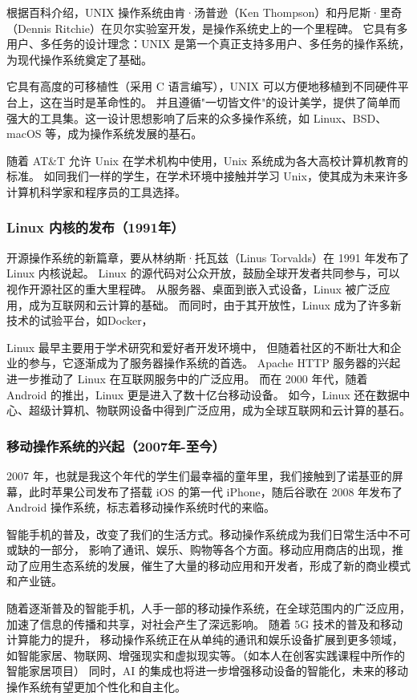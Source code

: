 \documentclass[UTF8]{homework}
\begin{document}
\begin{homeworkProblem}
根据百科介绍，UNIX 操作系统由肯·汤普逊（Ken Thompson）和丹尼斯·里奇（Dennis Ritchie）在贝尔实验室开发，是操作系统史上的一个里程碑。
它具有多用户、多任务的设计理念：UNIX 是第一个真正支持多用户、多任务的操作系统，为现代操作系统奠定了基础。

它具有高度的可移植性（采用 C 语言编写），UNIX 可以方便地移植到不同硬件平台上，这在当时是革命性的。
并且遵循"一切皆文件"的设计美学，提供了简单而强大的工具集。这一设计思想影响了后来的众多操作系统，如 Linux、BSD、macOS 等，成为操作系统发展的基石。

随着 AT\&T 允许 Unix 在学术机构中使用，Unix 系统成为各大高校计算机教育的标准。
如同我们一样的学生，在学术环境中接触并学习 Unix，使其成为未来许多计算机科学家和程序员的工具选择。

\subsubsection{Linux 内核的发布（1991年）}

开源操作系统的新篇章，要从林纳斯·托瓦兹（Linus Torvalds）在 1991 年发布了 Linux 内核说起。
Linux 的源代码对公众开放，鼓励全球开发者共同参与，可以视作开源社区的重大里程碑。
从服务器、桌面到嵌入式设备，Linux 被广泛应用，成为互联网和云计算的基础。
而同时，由于其开放性，Linux 成为了许多新技术的试验平台，如Docker，

Linux 最早主要用于学术研究和爱好者开发环境中，
但随着社区的不断壮大和企业的参与，它逐渐成为了服务器操作系统的首选。
Apache HTTP 服务器的兴起进一步推动了 Linux 在互联网服务中的广泛应用。
而在 2000 年代，随着 Android 的推出，Linux 更是进入了数十亿台移动设备。
如今，Linux 还在数据中心、超级计算机、物联网设备中得到广泛应用，成为全球互联网和云计算的基石。

\subsubsection{移动操作系统的兴起（2007年-至今）}

2007 年，也就是我这个年代的学生们最幸福的童年里，我们接触到了诺基亚的屏幕，此时苹果公司发布了搭载 iOS 的第一代 iPhone，随后谷歌在 2008 年发布了 Android 操作系统，标志着移动操作系统时代的来临。

智能手机的普及，改变了我们的生活方式。移动操作系统成为我们日常生活中不可或缺的一部分，
影响了通讯、娱乐、购物等各个方面。移动应用商店的出现，推动了应用生态系统的发展，催生了大量的移动应用和开发者，形成了新的商业模式和产业链。

随着逐渐普及的智能手机，人手一部的移动操作系统，在全球范围内的广泛应用，加速了信息的传播和共享，对社会产生了深远影响。
随着 5G 技术的普及和移动计算能力的提升，
移动操作系统正在从单纯的通讯和娱乐设备扩展到更多领域，
如智能家居、物联网、增强现实和虚拟现实等。（如本人在创客实践课程中所作的智能家居项目）
同时，AI 的集成也将进一步增强移动设备的智能化，未来的移动操作系统有望更加个性化和自主化。

\end{homeworkProblem}
\end{document}
